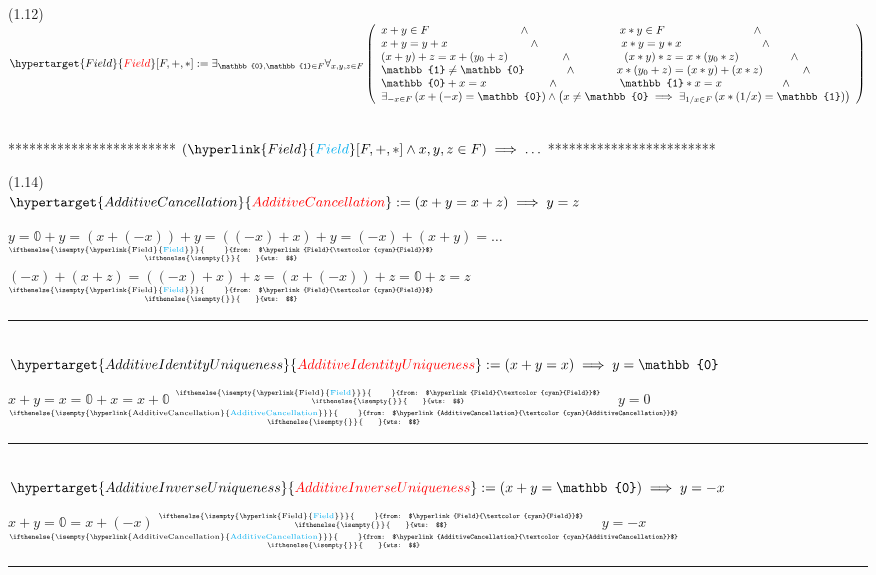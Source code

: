 \documentclass{book}
\newcommand{\df}[1]{\hypertarget{#1}{\textcolor{red}{#1}}}
\newcommand{\rf}[1]{\hyperlink{#1}{\textcolor{cyan}{#1}}}
\newcommand{\abr}{:=}
\newcommand{\pr}[1]{\left(#1\right)}
\newcommand{\thmcontext}[1]{\centerline{\\ ************************ #1 ************************ \\}}
\newcommand{\ann}[2]{%
  \hfill %
  $\stackrel%
  {\hbox{\tiny{\ifthenelse{\isempty{#1}}%
    {\phantom{from}}%
    {from: $#1$}}}}%
  {\hbox{\tiny{\ifthenelse{\isempty{#2}}%
    {\phantom{wts}}%
    {wts: $#2$}}}}$%
\ }
\begin{document}
(1.12) \\
$\df{Field}[F, +, *] \abr \exists_{\mathbb{0}, \mathbb{1} \in F} \forall_{x, y, z \in F}\left(\begin{array}{ll}
  x + y \in F \hfill \land \hfill x * y \in F \hfill \land \hfill \\
  x + y = y + x \hfill \land \hfill x * y = y * x \hfill \land \hfill \\
  (x + y) + z = x + (y_0 + z) \hfill \land \hfill (x * y) * z = x * (y_0 * z) \hfill \land \hfill \\
  \mathbb{1} \neq \mathbb{0} \hfill \land \hfill x * (y_0 + z) = (x * y) + (x * z) \hfill \land \hfill \\
  \mathbb{0} + x = x \hfill \land \hfill \mathbb{1} * x = x \hfill \land \hfill \\
  \exists_{-x \in F} \pr{x + (-x) = \mathbb{0}} \hfill \land \hfill \pr{x \neq \mathbb{0} \implies \exists_{1/x \in F}\pr{x * (1/x) = \mathbb{1}}}
\end{array}\right)$ \\

\thmcontext{$(\rf{Field}[F, +, *] \land x, y, z \in F) \implies \ldots$}
(1.14) \\
$\df{AdditiveCancellation} \abr (x + y = x + z) \implies y = z$
\begin{enumerate}
  \lit $y = \mathbb{0} + y = \pr{x + (-x)} + y = \pr{(-x) + x} + y = (-x) + (x + y) = \ldots$    \ann{\rf{Field}}{}
  \lit $(-x) + (x + z) = \pr{(-x) + x} + z = \pr{x + (-x)} + z = \mathbb{0} + z = z$    \ann{\rf{Field}}{}
\end{enumerate} \vspace{.75mm} \hrule \vspace{.75mm} \ \\

$\df{AdditiveIdentityUniqueness} \abr (x + y = x) \implies y = \mathbb{0}$ 
\begin{enumerate}
  \lit $x + y = x = \mathbb{0} + x = x + \mathbb{0}$    \ann{\rf{Field}}{}
  \lit $y = 0$    \ann{\rf{AdditiveCancellation}}{}
\end{enumerate} \vspace{.75mm} \hrule \vspace{.75mm} \ \\

$\df{AdditiveInverseUniqueness} \abr (x + y = \mathbb{0}) \implies y = -x$
\begin{enumerate}
  \lit $x + y = \mathbb{0} = x + (-x)$    \ann{\rf{Field}}{}
  \lit $y = -x$    \ann{\rf{AdditiveCancellation}}{}
\end{enumerate} \vspace{.75mm} \hrule \vspace{.75mm} \ \\
\end{document}
